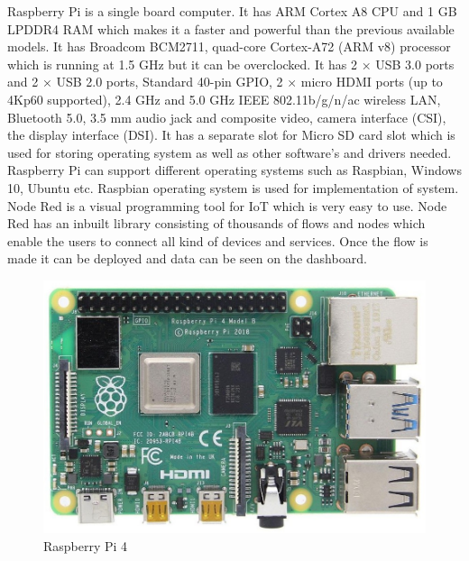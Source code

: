 Raspberry Pi is a single board computer. It has ARM
Cortex A8 CPU and 1 GB LPDDR4 RAM which makes it a faster and powerful than the previous available models. It has Broadcom
BCM2711, quad-core Cortex-A72 (ARM v8) processor which is running at 1.5 GHz but it can be overclocked. It has 2 × USB 3.0 ports and 2 × USB 2.0 ports, Standard 40-pin GPIO, 2 × micro HDMI ports (up to 4Kp60 supported), 2.4 GHz and 5.0 GHz IEEE 802.11b/g/n/ac wireless LAN, Bluetooth 5.0, 3.5 mm audio jack and
composite video, camera interface (CSI), the display interface
(DSI). It has a separate slot for Micro SD card slot which
is used for storing operating system as well as other software’s
and drivers needed. Raspberry Pi can support different
operating systems such as Raspbian, Windows 10, Ubuntu etc.
Raspbian operating system is used for implementation of
system. Node Red is a visual programming tool for IoT which
is very easy to use. Node Red has an inbuilt library consisting
of thousands of flows and nodes which enable the users to
connect all kind of devices and services. Once the flow is
made it can be deployed and data can be seen on the
dashboard.
\begin{figure}[!ht]
\centering
\includegraphics[width=\linewidth]{figures/raspberry.jpg}
\caption{\label{img32} Raspberry Pi 4}
\end{figure}

